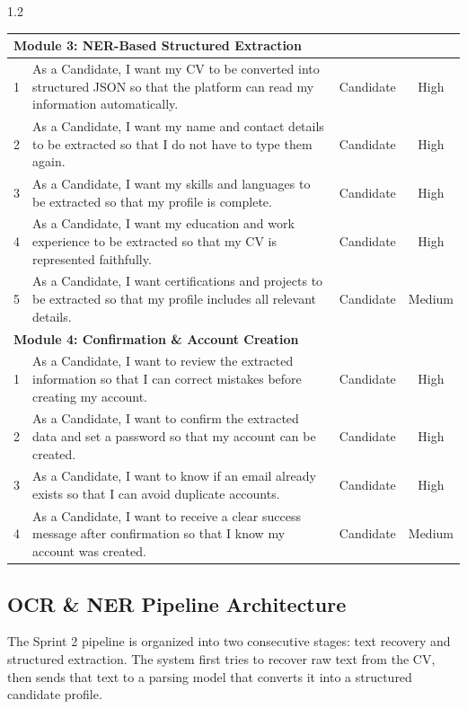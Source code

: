 \begin{spacing}{1.2}
\begin{center}
\begin{tabularx}{\textwidth}{|l|X|c|c|}
\multicolumn{4}{|l|}{\cellcolor{gray!10}\textbf{Module 3: NER-Based Structured Extraction}} \\ \hline
1 & As a Candidate, I want my CV to be converted into structured JSON so that the platform can read my information automatically. & Candidate & High \\ \hline
2 & As a Candidate, I want my name and contact details to be extracted so that I do not have to type them again. & Candidate & High \\ \hline
3 & As a Candidate, I want my skills and languages to be extracted so that my profile is complete. & Candidate & High \\ \hline
4 & As a Candidate, I want my education and work experience to be extracted so that my CV is represented faithfully. & Candidate & High \\ \hline
5 & As a Candidate, I want certifications and projects to be extracted so that my profile includes all relevant details. & Candidate & Medium \\ \hline

\multicolumn{4}{|l|}{\cellcolor{gray!10}\textbf{Module 4: Confirmation \& Account Creation}} \\ \hline
1 & As a Candidate, I want to review the extracted information so that I can correct mistakes before creating my account. & Candidate & High \\ \hline
2 & As a Candidate, I want to confirm the extracted data and set a password so that my account can be created. & Candidate & High \\ \hline
3 & As a Candidate, I want to know if an email already exists so that I can avoid duplicate accounts. & Candidate & High \\ \hline
4 & As a Candidate, I want to receive a clear success message after confirmation so that I know my account was created. & Candidate & Medium \\ \hline

\end{tabularx}
\end{center}
\end{spacing}

\subsection{OCR \& NER Pipeline Architecture}
\label{sec:sprint2:ocr_ner_architecture}

The Sprint 2 pipeline is organized into two consecutive stages: text recovery and structured extraction. The system first tries to recover raw text from the CV, then sends that text to a parsing model that converts it into a structured candidate profile.

